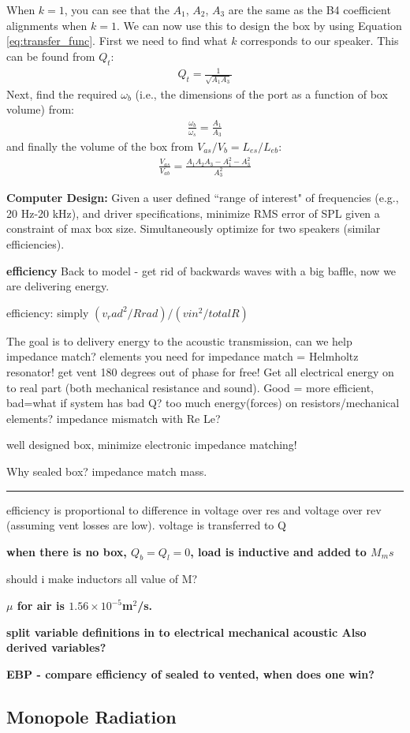 \documentclass[10pt,letterpaper]{book}
\begin{document}
When $k=1$, you can see that the $A_1$, $A_2$, $A_3$ are the same as the B4 coefficient alignments when $k=1$. We can now use this to design the box by using Equation \ref{eq:transfer_func}. First we need to find what $k$ corresponds to our speaker. This can be found from $Q_t$:
\begin{align}
Q_t=\frac{1}{\sqrt{A_1A_3}}
\end{align}
Next, find the required $\omega_b$ (i.e., the dimensions of the port as a function of box volume) from:
\begin{align}
\frac{\omega_b}{\omega_s}=\frac{A_1}{A_3}
\end{align}
and finally the volume of the box from $V_{as}/V_{b}=L_{es}/L_{eb}$:
\begin{align}
\frac{V_{as}}{V_{ab}}=\frac{A_1A_2A_3-A_1^2-A_3^2}{A_3^2}
\end{align}



\textbf{Computer Design:} Given a user defined ``range of interest" of frequencies (e.g., 20 Hz-20 kHz), and driver specifications, minimize RMS error of SPL given a constraint of max box size. Simultaneously optimize for two speakers (similar efficiencies).




\textbf{efficiency}
Back to model - get rid of backwards waves with a big baffle, now we are delivering energy.

efficiency: simply $(v_rad^2/Rrad) / (vin^2/totalR)$

The goal is to delivery energy to the acoustic transmission, can we help impedance match? elements you need for impedance match = Helmholtz resonator! get vent 180 degrees out of phase for free! Get all electrical energy on to real part (both mechanical resistance and sound). Good = more efficient, bad=what if system has bad Q? too much energy(forces) on resistors/mechanical elements? impedance mismatch with Re Le?

well designed box, minimize electronic impedance matching!

Why sealed box? impedance match mass.


\hrule

efficiency is proportional to difference in voltage over res and voltage over rev (assuming vent losses are low). voltage is transferred to Q

\textbf{when there is no box, $Q_b=Q_l=0$, load is inductive and added to $M_ms$}

should i make inductors all value of M?


\textbf{$\mu$ for air is $1.56\times10^{-5}$m$^2$/s.}

\textbf{split variable definitions in to electrical mechanical acoustic Also derived variables?}

\textbf{EBP - compare efficiency of sealed to vented, when does one win?}

\subsection{Monopole Radiation}


 
\end{document}
